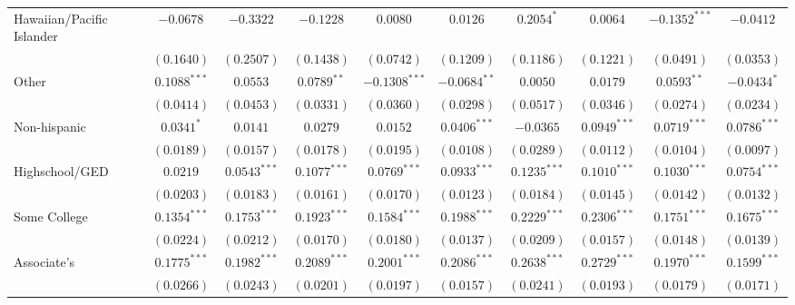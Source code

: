 \documentclass{article}
\begin{document}
\begin{table}
\begin{center}
\begin{tabular}{l c c c c c c c c c}
Hawaiian/Pacific Islander      & $-0.0678$       & $-0.3322$       & $-0.1228$       & $0.0080$        & $0.0126$        & $0.2054^{*}$    & $0.0064$        & $-0.1352^{***}$ & $-0.0412$       \\
                               & $(0.1640)$      & $(0.2507)$      & $(0.1438)$      & $(0.0742)$      & $(0.1209)$      & $(0.1186)$      & $(0.1221)$      & $(0.0491)$      & $(0.0353)$      \\
Other                          & $0.1088^{***}$  & $0.0553$        & $0.0789^{**}$   & $-0.1308^{***}$ & $-0.0684^{**}$  & $0.0050$        & $0.0179$        & $0.0593^{**}$   & $-0.0434^{*}$   \\
                               & $(0.0414)$      & $(0.0453)$      & $(0.0331)$      & $(0.0360)$      & $(0.0298)$      & $(0.0517)$      & $(0.0346)$      & $(0.0274)$      & $(0.0234)$      \\
Non-hispanic                   & $0.0341^{*}$    & $0.0141$        & $0.0279$        & $0.0152$        & $0.0406^{***}$  & $-0.0365$       & $0.0949^{***}$  & $0.0719^{***}$  & $0.0786^{***}$  \\
                               & $(0.0189)$      & $(0.0157)$      & $(0.0178)$      & $(0.0195)$      & $(0.0108)$      & $(0.0289)$      & $(0.0112)$      & $(0.0104)$      & $(0.0097)$      \\
Highschool/GED                 & $0.0219$        & $0.0543^{***}$  & $0.1077^{***}$  & $0.0769^{***}$  & $0.0933^{***}$  & $0.1235^{***}$  & $0.1010^{***}$  & $0.1030^{***}$  & $0.0754^{***}$  \\
                               & $(0.0203)$      & $(0.0183)$      & $(0.0161)$      & $(0.0170)$      & $(0.0123)$      & $(0.0184)$      & $(0.0145)$      & $(0.0142)$      & $(0.0132)$      \\
Some College                   & $0.1354^{***}$  & $0.1753^{***}$  & $0.1923^{***}$  & $0.1584^{***}$  & $0.1988^{***}$  & $0.2229^{***}$  & $0.2306^{***}$  & $0.1751^{***}$  & $0.1675^{***}$  \\
                               & $(0.0224)$      & $(0.0212)$      & $(0.0170)$      & $(0.0180)$      & $(0.0137)$      & $(0.0209)$      & $(0.0157)$      & $(0.0148)$      & $(0.0139)$      \\
Associate's                    & $0.1775^{***}$  & $0.1982^{***}$  & $0.2089^{***}$  & $0.2001^{***}$  & $0.2086^{***}$  & $0.2638^{***}$  & $0.2729^{***}$  & $0.1970^{***}$  & $0.1599^{***}$  \\
                               & $(0.0266)$      & $(0.0243)$      & $(0.0201)$      & $(0.0197)$      & $(0.0157)$      & $(0.0241)$      & $(0.0193)$      & $(0.0179)$      & $(0.0171)$      \\

\end{tabular}
\end{center}
\end{table}
\end{document}

